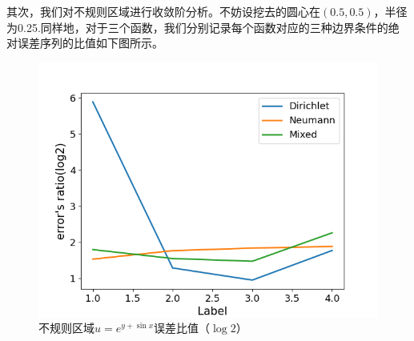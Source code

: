 \documentclass{ctexart}
\begin{document}
\begin{sloppypar}
其次，我们对不规则区域进行收敛阶分析。不妨设挖去的圆心在$(0.5,0.5)$，半径为0.25.同样地，对于三个函数，我们分别记录每个函数对应的三种边界条件的绝对误差序列的比值如下图所示。
\begin{figure}[H]
\centering
\includegraphics[scale = 0.5]{f1_IPE.png}
\caption{不规则区域$u=e^{y+\sin x}$误差比值（$\log 2$）}
\label{fig7}
\end{figure}


\end{sloppypar}
\end{document}
